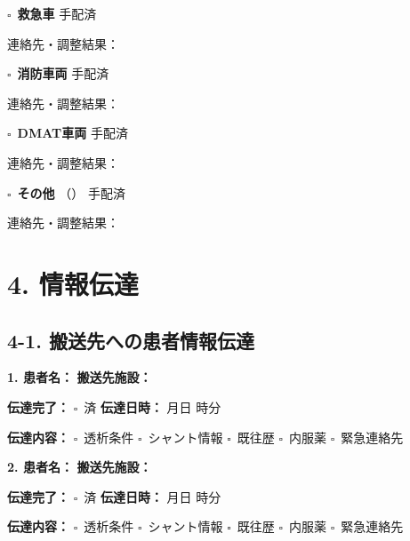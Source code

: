 \documentclass[a4paper,12pt]{jarticle}
\newcommand{\checkbox}{$\square$\ }
\newcommand{\underlinespace}[1]{\underline{\hspace{#1}}}
\begin{document}
\checkbox \textbf{救急車} 手配済

\quad 連絡先・調整結果： \underlinespace{10cm}

\vspace{3mm}

\checkbox \textbf{消防車両} 手配済

\quad 連絡先・調整結果： \underlinespace{10cm}

\vspace{3mm}

\checkbox \textbf{DMAT車両} 手配済

\quad 連絡先・調整結果： \underlinespace{10cm}

\vspace{3mm}

\checkbox \textbf{その他} （\underlinespace{4cm}） 手配済

\quad 連絡先・調整結果： \underlinespace{10cm}

\vspace{3mm}


\newpage

\section*{4. 情報伝達}

\subsection*{4-1. 搬送先への患者情報伝達}

\textbf{1. 患者名：} \underlinespace{4cm} \quad \textbf{搬送先施設：} \underlinespace{4cm}

\quad \textbf{伝達完了：} \checkbox 済 \quad \textbf{伝達日時：} \underlinespace{1cm}月\underlinespace{1cm}日 \underlinespace{1cm}時\underlinespace{1cm}分

\quad \textbf{伝達内容：} \checkbox 透析条件 \checkbox シャント情報 \checkbox 既往歴 \checkbox 内服薬 \checkbox 緊急連絡先

\vspace{4mm}

\textbf{2. 患者名：} \underlinespace{4cm} \quad \textbf{搬送先施設：} \underlinespace{4cm}

\quad \textbf{伝達完了：} \checkbox 済 \quad \textbf{伝達日時：} \underlinespace{1cm}月\underlinespace{1cm}日 \underlinespace{1cm}時\underlinespace{1cm}分

\quad \textbf{伝達内容：} \checkbox 透析条件 \checkbox シャント情報 \checkbox 既往歴 \checkbox 内服薬 \checkbox 緊急連絡先
\end{document}

